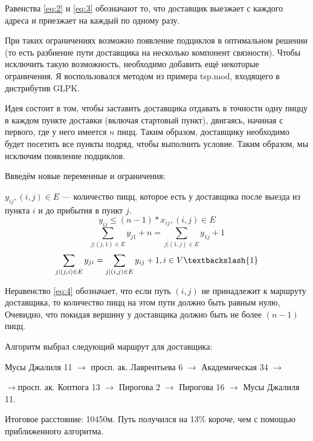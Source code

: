 \documentclass[]{article}
\begin{document}
Равенства \eqref{eq:2} и \eqref{eq:3} обозначают то, что
доставщик выезжает с каждого адреса и приезжает на каждый по одному разу.

При таких ограничениях возможно появление подциклов в оптимальном решении
(то есть разбиение пути доставщика на несколько компонент связности).
Чтобы исключить такую возможность, необходимо добавить ещё некоторые ограничения.
Я воспользовался методом из примера tsp.mod, входящего в дистрибутив GLPK.

Идея состоит в том, чтобы заставить доставщика отдавать в точности одну
пиццу в каждом пункте доставки (включая стартовый пункт), двигаясь, начиная
с первого, где у него имеется $n$ пицц. Таким образом, доставщику необходимо
будет посетить все пункты подряд, чтобы выполнить условие.
Таким образом, мы исключим появление подциклов.

Ввведём новые переменные и ограничения:

$y_{ij}, (i,j)\in E $ --- количество пицц, которое есть у доставщика
после выезда из пункта $i$ и до прибытия в пункт $j$.
\begin{equation} \label{eq:4}
	y_{ij} \leq (n-1) * x_{ij}, (i,j) \in E
\end{equation}
\begin{equation} \label{eq:5}
	\sum_{j| (j,1) \in E} y_{j1} + n = \sum_{j| (1, j) \in E} y_{1j} + 1
\end{equation}
\begin{equation}\label{eq:6}
	\sum_{j| (j,i) \in E} y_{ji} = \sum_{j| (i, j) \in E} y_{ij} + 1, i \in V \textbackslash\{1\}
\end{equation}

Неравенство \eqref{eq:4} обозначает, что если путь $(i,j)$ не принадлежит к
маршруту доставщика, то количество пицц на этом пути должно быть равным нулю,
Очевидно, что покидая вершину у доставщика должно быть не более $(n - 1)$ пицц.

Алгоритм выбрал следующий маршрут для доставщика:


Мусы Джалиля 11 $\rightarrow$ просп. ак. Лаврентьева 6 $\rightarrow$ Академическая 34 $\rightarrow$

$\rightarrow$просп. ак. Коптюга 13 $\rightarrow$ Пирогова 2 $\rightarrow$ Пирогова 16 $\rightarrow$ Мусы Джалиля 11.

Итоговое расстояние: 10450м. Путь получился на 13\% короче, чем с помощью приближенного алгоритма.
\end{document}
